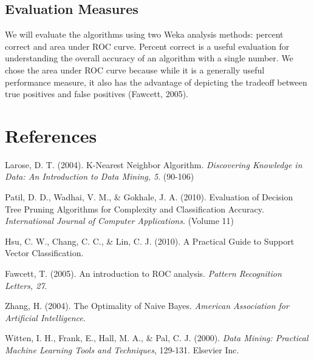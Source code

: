 \documentclass[11pt]{article} %
\begin{document}
\subsection{Evaluation Measures}
We will evaluate the algorithms using two Weka analysis methods: percent correct and area under ROC curve.  Percent correct is a useful evaluation for understanding the overall accuracy of an algorithm with a single number.  We chose the area under ROC curve because while it is a generally useful performance measure, it also has the advantage of depicting the tradeoff between true positives and false positives (Fawcett, 2005).

\section{References}
\hangindent=0.7cm
 Larose, D. T. (2004). K-Nearest Neighbor Algorithm. \textit{Discovering Knowledge in Data: An Introduction to Data Mining, 5}.  (90-106)

\hangindent=0.7cm
\noindent Patil, D. D., Wadhai, V. M., \& Gokhale, J. A. (2010). Evaluation of Decision Tree Pruning Algorithms for Complexity and Classification Accuracy. \textit{International Journal of Computer Applications}. (Volume 11)

\hangindent=0.7cm
\noindent Hsu, C. W., Chang, C. C., \& Lin, C. J. (2010). A Practical Guide to Support Vector Classification.

\hangindent=0.7cm
\noindent Fawcett, T. (2005). An introduction to ROC analysis. \textit{Pattern Recognition Letters, 27}. 

\hangindent=0.7cm
\noindent Zhang, H. (2004). The Optimality of Naive Bayes. \textit{American Association for Artificial Intelligence}.

\hangindent=0.7cm
\noindent Witten, I. H., Frank, E., Hall, M. A., \& Pal, C. J. (2000). \textit{Data Mining: Practical Machine Learning Tools and Techniques}, 129-131. Elsevier Inc.
\end{document}
